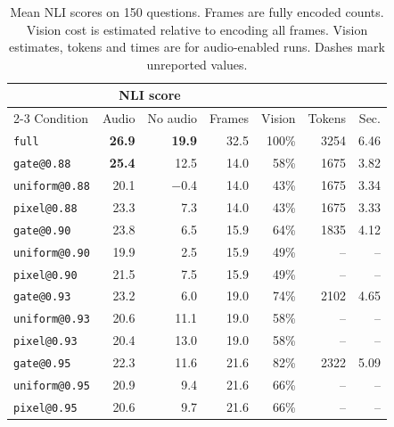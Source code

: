 \documentclass[conference]{IEEEtran}
\newcommand{\cond}[1]{\texttt{#1}}
\begin{document}
\begin{table}[t]
\centering
\caption{Mean NLI scores on 150 questions. Frames are fully encoded counts. Vision cost is estimated relative to encoding all frames. Vision estimates, tokens and times are for audio-enabled runs. Dashes mark unreported values.}
\label{tab:main}
\footnotesize
\setlength{\tabcolsep}{2.4pt}
\begin{tabular}{@{}lrrrrrr@{}}
\toprule
 & \multicolumn{2}{c}{NLI score} & & & & \\
\cmidrule(lr){2-3}
Condition & Audio & No audio & Frames & Vision & Tokens & Sec. \\
\midrule
\cond{full}          & \textbf{26.9} & \textbf{19.9} & 32.5 & 100\% & 3254 & 6.46 \\
\midrule
\cond{gate@0.88}     & \textbf{25.4} & 12.5 & 14.0 & 58\% & 1675 & 3.82 \\
\cond{uniform@0.88}  & 20.1 & $-$0.4 & 14.0 & 43\% & 1675 & 3.34 \\
\cond{pixel@0.88}    & 23.3 & 7.3  & 14.0 & 43\% & 1675 & 3.33 \\
\midrule
\cond{gate@0.90}     & 23.8 & 6.5  & 15.9 & 64\% & 1835 & 4.12 \\
\cond{uniform@0.90}  & 19.9 & 2.5  & 15.9 & 49\% & -- & -- \\
\cond{pixel@0.90}    & 21.5 & 7.5  & 15.9 & 49\% & -- & -- \\
\midrule
\cond{gate@0.93}     & 23.2 & 6.0  & 19.0 & 74\% & 2102 & 4.65 \\
\cond{uniform@0.93}  & 20.6 & 11.1 & 19.0 & 58\% & -- & -- \\
\cond{pixel@0.93}    & 20.4 & 13.0 & 19.0 & 58\% & -- & -- \\
\midrule
\cond{gate@0.95}     & 22.3 & 11.6 & 21.6 & 82\% & 2322 & 5.09 \\
\cond{uniform@0.95}  & 20.9 & 9.4  & 21.6 & 66\% & -- & -- \\
\cond{pixel@0.95}    & 20.6 & 9.7  & 21.6 & 66\% & -- & -- \\
\bottomrule
\end{tabular}
\end{table}
\end{document}
